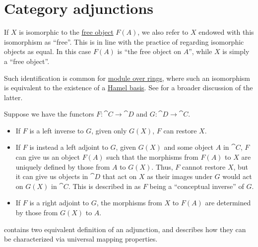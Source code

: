 \section{Category adjunctions}\label{sec:category_adjunctions}

\begin{concept}\label{con:free_construction}
\end{concept}

\begin{remark}\label{rem:free_construction_univalence}
  If \( X \) is isomorphic to the \hyperref[con:free_construction]{free object} \( F(A) \), we also refer to \( X \) endowed with this isomorphism as \enquote{free}. This is in line with the practice of regarding isomorphic objects as equal. In this case \( F(A) \) is \enquote{the free object on \( A \)}, while \( X \) is simply a \enquote{free object}.

  Such identification is common for \hyperref[def:module]{module over rings}, where such an isomorphism is equivalent to the existence of a \hyperref[def:hamel_basis]{Hamel basis}. See  for a broader discussion of the latter.
\end{remark}

\begin{remark}\label{rem:adjoint_functors}
  Suppose we have the functors \( F: \cat{C} \to \cat{D} \) and \( G: \cat{D} \to \cat{C} \).

  \begin{itemize}
    \item If \( F \) is a left inverse to \( G \), given only \( G(X) \), \( F \) can restore \( X \).

    \item If \( F \) is instead a left adjoint to \( G \), given \( G(X) \) and some object \( A \) in \( \cat{C} \), \( F \) can give us an object \( F(A) \) such that the morphisms from \( F(A) \) to \( X \) are uniquely defined by those from \( A \) to \( G(X) \). Thus, \( F \) cannot restore \( X \), but it can give us objects in \( \cat{D} \) that act on \( X \) as their images under \( G \) would act on \( G(X) \) in \( \cat{C} \). This is described in \cite{StanfordPlato:category_theory} as \( F \) being a \enquote{conceptual inverse} of \( G \).

    \item If \( F \) is a right adjoint to \( G \), the morphisms from \( X \) to \( F(A) \) are determined by those from \( G(X) \) to \( A \).
  \end{itemize}

   contains two equivalent definition of an adjunction, and  describes how they can be characterized via universal mapping properties.
\end{remark}

